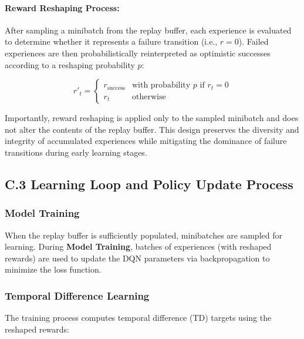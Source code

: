 \documentclass[11pt,a4paper]{article}
\begin{document}
\paragraph{Reward Reshaping Process:}

After sampling a minibatch from the replay buffer, each experience is evaluated to determine whether it represents a failure transition (i.e., $r = 0$). Failed experiences are then probabilistically reinterpreted as optimistic successes according to a reshaping probability $p$:

\[
r'_t = \begin{cases}
r_\text{success} & \text{with probability } p \text{ if } r_t = 0 \\
r_t & \text{otherwise}
\end{cases}
\]

Importantly, reward reshaping is applied only to the sampled minibatch and does not alter the contents of the replay buffer. This design preserves the diversity and integrity of accumulated experiences while mitigating the dominance of failure transitions during early learning stages.


\subsection{C.3 Learning Loop and Policy Update Process}
\label{app:policy-update}

\subsubsection{Model Training}

When the replay buffer is sufficiently populated, minibatches are sampled for learning. During \textbf{Model Training}, batches of experiences (with reshaped rewards) are used to update the DQN parameters via backpropagation to minimize the loss function.

\subsubsection{Temporal Difference Learning}

The training process computes temporal difference (TD) targets using the reshaped rewards:
\end{document}

